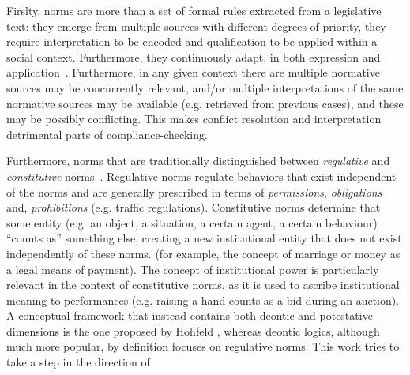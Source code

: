 Firslty, norms are more than a set of formal rules extracted from a legislative text: they emerge from multiple sources with different degrees of priority, they require interpretation to be encoded and qualification to be applied within a social context. Furthermore, they continuously adapt, in both expression and application~\cite{Boella2014APractice}. Furthermore, in any given context there are multiple normative sources may be concurrently relevant, and/or multiple interpretations of the same normative sources may be available (e.g. retrieved from previous cases), and these may be possibly conflicting. This makes conflict resolution and interpretation detrimental parts of compliance-checking.


Furthermore, norms that are traditionally distinguished between \textit{regulative} and \textit{constitutive} norms~\cite{Searle1969,Boella2004RegulativeSystems,Sileno2015}. Regulative norms regulate behaviors that exist independent of the norms and are generally prescribed in terms of \textit{permissions}, \textit{obligations} and, \textit{prohibitions} (e.g. traffic regulations). Constitutive norms determine that some entity (e.g. an object, a situation, a certain agent, a certain behaviour) ``counts as'' something else, creating a new institutional entity that does not exist independently of these norms. (for example, the concept of marriage or money as a legal means of payment). The concept of institutional power is particularly relevant in the context of constitutive norms, as it is used to ascribe institutional meaning to  performances (e.g. raising a hand counts as a bid during an auction). A conceptual framework that instead contains both deontic and potestative dimensions is the one proposed by Hohfeld \cite{hohfeld1917fundamental}, whereas deontic logics, although much more popular, by definition focuses on regulative norms. This work tries to take a step in the direction of 


